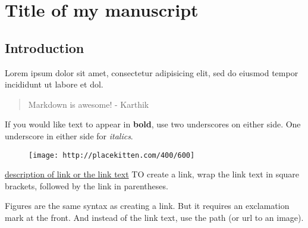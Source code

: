 \section{Title of my manuscript}\label{title-of-my-manuscript}

\subsection{Introduction}\label{introduction}

Lorem ipsum dolor sit amet, consectetur adipisicing elit, sed do eiusmod
tempor incididunt ut labore et dol.

\begin{quote}
Markdown is awesome! - Karthik
\end{quote}

If you would like text to appear in \textbf{bold}, use two underscores
on either side. One underscore in either side for \emph{italics}.

\begin{figure}[htbp]
\centering
\texttt{[image: http://placekitten.com/400/600]}
\end{figure}

\begin{Shaded}
\begin{Highlighting}[]
\NormalTok{)}
\end{Highlighting}
\end{Shaded}

\href{http://nceas.ucsb.edu/}{description of link or the link text} TO
create a link, wrap the link text in square brackets, followed by the
link in parentheses.

Figures are the same syntax as creating a link. But it requires an
exclamation mark at the front. And instead of the link text, use the
path (or url to an image).
